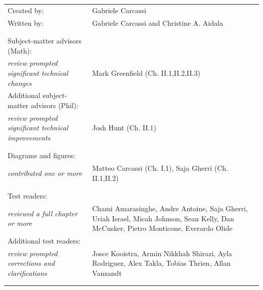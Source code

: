 \documentclass[11pt,letterpaper,fleqn]{memoir} %
\begin{document}
\begin{table}[h]
\centering
\begin{tabular}{>{\raggedleft}p{} >{\raggedright\arraybackslash}p{}}
Created by: & Gabriele Carcassi \\
Written by: & Gabriele Carcassi and Christine A. Aidala \\
& \\
& \\
Subject-matter advisors (Math): \\ \textit{\footnotesize review prompted significant technical changes} & Mark Greenfield (Ch. II.1,II.2,II.3) \\
Additional subject-matter advisors (Phil): \\ \textit{\footnotesize review prompted significant technical improvements} & Josh Hunt (Ch. II.1) \\
& \\
& \\
Diagrams and figures: \\ \textit{\footnotesize contributed one or more} & Matteo Carcassi (Ch. I.1), Saja Gherri (Ch. II.1,II.2) \\
& \\
& \\
Test readers: \\ \textit{\footnotesize reviewed a full chapter or more} & Chami Amarasinghe, Andre Antoine, Saja Gherri, Uriah Israel, Micah Johnson, Sean Kelly, Dan McCusker, Pietro Monticone, Everardo Olide \\
Additional test readers: \\ \textit{\footnotesize review prompted corrections and clarifications} & Josce Kooistra, Armin Nikkhah Shirazi, Ayla Rodriguez, Alex Takla, Tobias Thrien, Allan Vanzandt \\
& \\
& \\





\end{tabular} 
\end{table}


	
\end{document}
